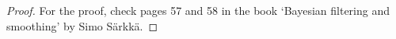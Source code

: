 \begin{proof}
For the proof, check pages 57 and 58 in the book `Bayesian filtering and smoothing' by Simo Särkkä. 
\end{proof}









